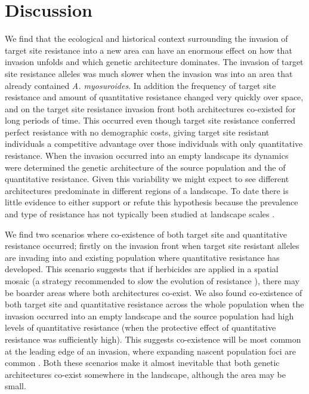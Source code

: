\documentclass[10pt,letterpaper]{article}
\begin{document}
\section*{Discussion}
We find that the ecological and historical context surrounding the invasion of target site resistance into a new area can have an enormous effect on how that invasion unfolds and which genetic architecture dominates. The invasion of target site resistance alleles was much slower when the invasion was into an area that already contained \textit{A. myosuroides}. In addition the frequency of target site resistance and amount of quantitative resistance changed very quickly over space, and on the target site resistance invasion front both architectures co-existed for long periods of time. This occurred even though target site resistance conferred perfect resistance with no demographic costs, giving target site resistant individuals a competitive advantage over those individuals with only quantitative resistance. When the invasion occurred into an empty landscape its dynamics were determined the genetic architecture of the source population and the of quantitative resistance. Given this variability we might expect to see different architectures predominate in different regions of a landscape. To date there is little evidence to either support or refute this hypothesis because the prevalence and type of resistance has not typically been studied at landscape scales \cite{Dely2013}.

We find two scenarios where co-existence of both target site and quantitative resistance occurred; firstly on the invasion front when target site resistant alleles are invading into and existing population where quantitative resistance has developed. This scenario suggests that if herbicides are applied in a spatial mosaic (a strategy recommended to slow the evolution of resistance \cite{Rex2013}), there may be boarder areas where both architectures co-exist. We also found co-existence of both target site and quantitative resistance across the whole population when the invasion occurred into an empty landscape and the source population had high levels of quantitative resistance (when the protective effect of quantitative resistance was sufficiently high). This suggests co-existence will be most common at the leading edge of an invasion, where expanding nascent population foci are common \cite{Mooy1988}. Both these scenarios make it almost inevitable that both genetic architectures co-exist somewhere in the landscape, although the area may be small.
\end{document}
